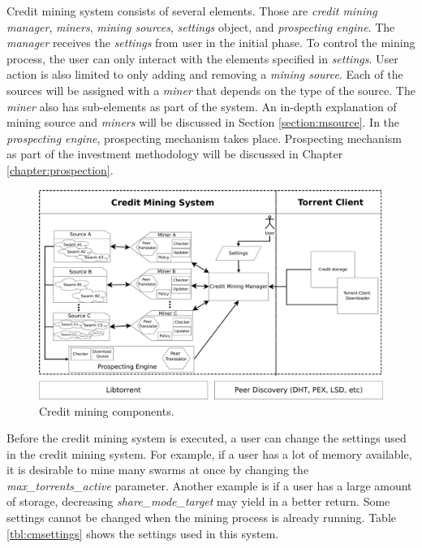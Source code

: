 Credit mining system consists of several elements. Those are \textit{credit mining manager}, \textit{miners}, \textit{mining sources}, \textit{settings} object, and \textit{prospecting engine}. The \textit{manager} receives the \textit{settings} from user in the initial phase. To control the mining process, the user can only interact with the elements specified in \textit{settings}. User action is also limited to only adding and removing a \textit{mining source}. Each of the sources will be assigned with a \textit{miner} that depends on the type of the source. The \textit{miner} also has sub-elements as part of the system. An in-depth explanation of mining source and \textit{miners} will be discussed in Section \ref{section:msource}. In the \textit{prospecting engine}, prospecting mechanism takes place. Prospecting mechanism as part of the investment methodology will be discussed in Chapter \ref{chapter:prospection}.

\begin{figure}[ht]
	\centering
 	\includegraphics[width=\textwidth]{pics/cm_components.pdf}
	\caption{Credit mining components.}
	\label{fig:cmcomponents}
\end{figure}

Before the credit mining system is executed, a user can change the settings used in the credit mining system. For example, if a user has a lot of memory available, it is desirable to mine many swarms at once by changing the \textit{max\_torrents\_active} parameter. Another example is if a user has a large amount of storage, decreasing \textit{share\_mode\_target} may yield in a better return. Some settings cannot be changed when the mining process is already running. Table \ref{tbl:cmsettings} shows the settings used in this system. 

